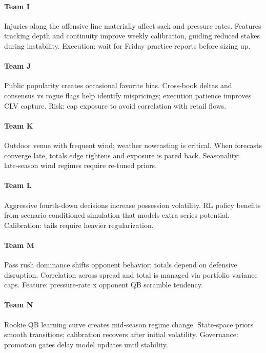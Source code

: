 \documentclass[12pt]{report}  %
\numberwithin{equation}{section}
\theoremstyle{plain}
\theoremstyle{definition}
\theoremstyle{remark}
\begin{document}
\paragraph{Team I} Injuries along the offensive line materially affect sack and pressure rates. Features tracking depth and continuity improve weekly calibration, guiding reduced stakes during instability. Execution: wait for Friday practice reports before sizing up.

\paragraph{Team J} Public popularity creates occasional favorite bias. Cross-book deltas and consensus vs rogue flags help identify mispricings; execution patience improves CLV capture. Risk: cap exposure to avoid correlation with retail flows.

\paragraph{Team K} Outdoor venue with frequent wind; weather nowcasting is critical. When forecasts converge late, totals edge tightens and exposure is pared back. Seasonality: late‑season wind regimes require re‑tuned priors.

\paragraph{Team L} Aggressive fourth-down decisions increase possession volatility. RL policy benefits from scenario-conditioned simulation that models extra series potential. Calibration: tails require heavier regularization.

\paragraph{Team M} Pass rush dominance shifts opponent behavior; totals depend on defensive disruption. Correlation across spread and total is managed via portfolio variance caps. Feature: pressure‑rate x opponent QB scramble tendency.

\paragraph{Team N} Rookie QB learning curve creates mid-season regime change. State-space priors smooth transitions; calibration recovers after initial volatility. Governance: promotion gates delay model updates until stability.
\end{document}
